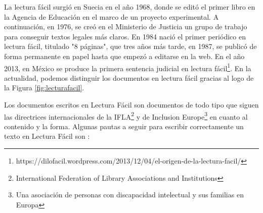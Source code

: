 La lectura fácil surgió en Suecia en el año 1968, donde se editó el primer libro en la Agencia de Educación en el marco de un proyecto experimental. A continuación, en 1976, se creó en el Ministerio de Justicia un grupo de trabajo para conseguir textos legales más claros.
En 1984 nació el primer periódico en lectura fácil, titulado "8 páginas", que tres años más tarde, en 1987, se publicó de forma permanente en papel hasta que empezó a editarse en la web. 
En el año 2013, en México se produce la primera sentencia judicial en lectura fácil\footnote{https://dilofacil.wordpress.com/2013/12/04/el-origen-de-la-lectura-facil/}. En la actualidad, podemos distinguir los documentos en lectura fácil gracias al logo de la Figura \ref{fig:lecturafacil}.

	
	
Los documentos escritos en Lectura Fácil \citep{lecturafacil} son documentos de todo tipo que siguen las directrices internacionales de la IFLA\footnote{International Federation of Library Associations and Institutions} y de Inclusion Europe\footnote{Una asociación de personas con discapacidad intelectual y sus familias en Europa} en cuanto al contenido y la forma.
Algunas pautas a seguir para escribir correctamente un texto en Lectura Fácil son \citep{GarciaMunoz2012LecturaFacil}:


